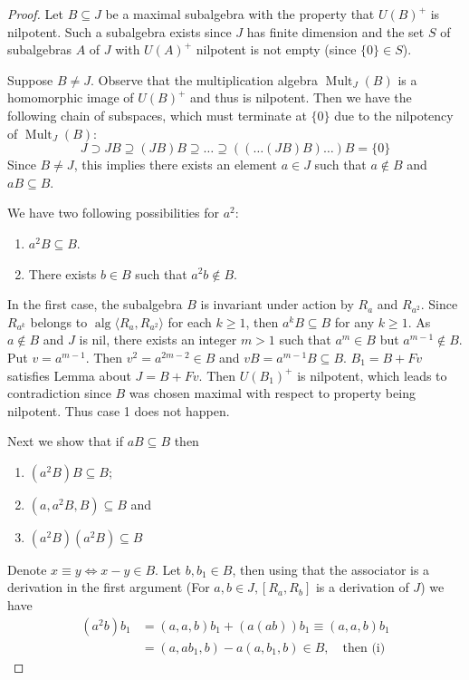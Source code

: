 \documentclass{article}
\begin{document}
\begin{proof} 
Let $B \subseteq J$ be a maximal subalgebra with the property that $U(B)^+$ is nilpotent. Such a subalgebra exists since $J$ has finite dimension and the set $S$ of subalgebras $A$ of $J$ with $U(A)^+$ nilpotent is not empty (since $\{0\} \in S$).  

Suppose $B \neq J$. Observe that the multiplication algebra $\operatorname{Mult}_J(B)$ is a homomorphic image of $U(B)^+$ and thus is nilpotent. Then we have the following chain of subspaces, which must terminate at $\{0\}$ due to the nilpotency of $\operatorname{Mult}_J(B)$:  
\[ J \supset JB \supseteq (JB)B \supseteq \dots \supseteq ((\dots(JB)B)\dots)B = \{0\} \]  
Since $B \neq J$, this implies there exists an element $a \in J$ such that $a \notin B$ and $aB \subseteq B$.  

We have two following possibilities for $a^2$:  
\begin{enumerate}  
    \item $a^2 B \subseteq B$.  
    \item There exists $b \in B$ such that $a^2 b \notin B$.  
\end{enumerate}  

In the first case, the subalgebra $B$ is invariant under action by $R_a$ and $R_{a^2}$. Since $R_{a^k}$ belongs to $\operatorname{alg}\langle R_a, R_{a^2} \rangle$ for each $k \ge 1$, then $a^k B \subseteq B$ for any $k \ge 1$. As $a \notin B$ and $J$ is nil, there exists an integer $m > 1$ such that $a^m \in B$ but $a^{m-1} \notin B$. Put $v = a^{m-1}$. Then $v^2 = a^{2m-2} \in B$ and $vB = a^{m-1}B \subseteq B$. $B_1 = B + Fv$ satisfies Lemma about $J = B + Fv$. Then $U(B_1)^+$ is nilpotent, which leads to contradiction since $B$ was chosen maximal with respect to property being nilpotent. Thus case 1 does not happen. 

Next we show that if $aB \subseteq B$ then  
\begin{enumerate}
    \item $(a^2B)B \subseteq B$;  
    \item $(a, a^2B, B) \subseteq B$ and  
    \item $(a^2B)(a^2B) \subseteq B$  
\end{enumerate}  

Denote $x \equiv y \iff x - y \in B$. Let $b, b_1 \in B$, then using that the associator is a derivation in the first argument (For $a, b \in J, [R_a, R_b]$ is a derivation of $J$) we have  
\begin{align*}  
    (a^2b)b_1 &= (a,a,b)b_1 + (a(ab))b_1 \equiv (a,a,b)b_1 \\
    &= (a, ab_1, b) - a(a, b_1, b) \in B, \quad \text{then (i)}  
\end{align*}  


\end{proof}
\end{document}
